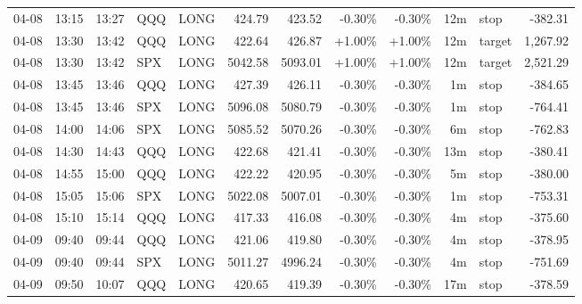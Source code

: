 \documentclass[11pt,a4paper,twoside]{article}
\begin{document}
\begin{center}
\begin{longtable}{>{\color{txtmain}}l l l l l r r r r r >{\color{txtmain}}l r}
04-08 & 13:15 & 13:27 & QQQ & LONG & 424.79 & 423.52 & \textcolor{lossred}{-0.30\%} & \textcolor{lossred}{-0.30\%} & 12m & stop & \textcolor{lossred}{-382.31} \\
04-08 & 13:30 & 13:42 & QQQ & LONG & 422.64 & 426.87 & \textcolor{wingreen}{+1.00\%} & \textcolor{wingreen}{+1.00\%} & 12m & target & \textcolor{wingreen}{1,267.92} \\
04-08 & 13:30 & 13:42 & SPX & LONG & 5042.58 & 5093.01 & \textcolor{wingreen}{+1.00\%} & \textcolor{wingreen}{+1.00\%} & 12m & target & \textcolor{wingreen}{2,521.29} \\
04-08 & 13:45 & 13:46 & QQQ & LONG & 427.39 & 426.11 & \textcolor{lossred}{-0.30\%} & \textcolor{lossred}{-0.30\%} & 1m & stop & \textcolor{lossred}{-384.65} \\
04-08 & 13:45 & 13:46 & SPX & LONG & 5096.08 & 5080.79 & \textcolor{lossred}{-0.30\%} & \textcolor{lossred}{-0.30\%} & 1m & stop & \textcolor{lossred}{-764.41} \\
04-08 & 14:00 & 14:06 & SPX & LONG & 5085.52 & 5070.26 & \textcolor{lossred}{-0.30\%} & \textcolor{lossred}{-0.30\%} & 6m & stop & \textcolor{lossred}{-762.83} \\
04-08 & 14:30 & 14:43 & QQQ & LONG & 422.68 & 421.41 & \textcolor{lossred}{-0.30\%} & \textcolor{lossred}{-0.30\%} & 13m & stop & \textcolor{lossred}{-380.41} \\
04-08 & 14:55 & 15:00 & QQQ & LONG & 422.22 & 420.95 & \textcolor{lossred}{-0.30\%} & \textcolor{lossred}{-0.30\%} & 5m & stop & \textcolor{lossred}{-380.00} \\
04-08 & 15:05 & 15:06 & SPX & LONG & 5022.08 & 5007.01 & \textcolor{lossred}{-0.30\%} & \textcolor{lossred}{-0.30\%} & 1m & stop & \textcolor{lossred}{-753.31} \\
04-08 & 15:10 & 15:14 & QQQ & LONG & 417.33 & 416.08 & \textcolor{lossred}{-0.30\%} & \textcolor{lossred}{-0.30\%} & 4m & stop & \textcolor{lossred}{-375.60} \\
04-09 & 09:40 & 09:44 & QQQ & LONG & 421.06 & 419.80 & \textcolor{lossred}{-0.30\%} & \textcolor{lossred}{-0.30\%} & 4m & stop & \textcolor{lossred}{-378.95} \\
04-09 & 09:40 & 09:44 & SPX & LONG & 5011.27 & 4996.24 & \textcolor{lossred}{-0.30\%} & \textcolor{lossred}{-0.30\%} & 4m & stop & \textcolor{lossred}{-751.69} \\
04-09 & 09:50 & 10:07 & QQQ & LONG & 420.65 & 419.39 & \textcolor{lossred}{-0.30\%} & \textcolor{lossred}{-0.30\%} & 17m & stop & \textcolor{lossred}{-378.59} \\

\end{longtable}
\end{center}
\end{document}
